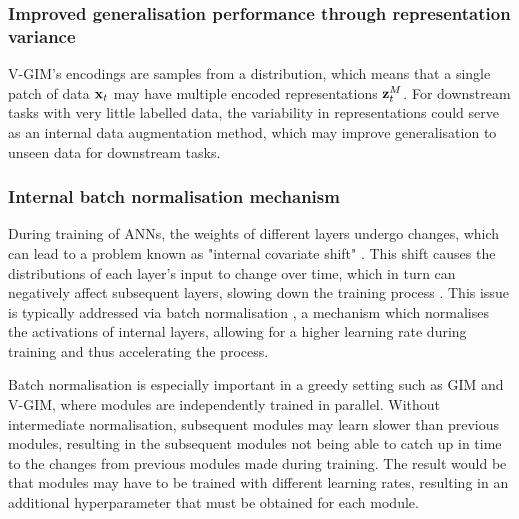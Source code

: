 	
	\subsubsection{Improved generalisation performance through representation variance}
		V-GIM's encodings are samples from a distribution, which means that a single patch of data $\mathbf{x}_t$ may have multiple encoded representations $\mathbf{z}_t^M$. For downstream tasks with very little labelled data, the variability in representations could serve as an internal data augmentation method, which may improve generalisation to unseen data for downstream tasks.
		

	
	\subsubsection{Internal batch normalisation mechanism}
		During training of ANNs, the weights of different layers undergo changes, which can lead to a problem known as "internal covariate shift" \cite{ioffeBatchNormalizationAccelerating2015}. This shift causes the distributions of each layer's input to change over time, which in turn can negatively affect subsequent layers, slowing down the training process \cite{bjorckUnderstandingBatchNormalization2018, lecunEfficientBackProp1998}. This issue is typically addressed via batch normalisation \cite{santurkarHowDoesBatch2018, bjorckUnderstandingBatchNormalization2018}, a mechanism which normalises the activations of internal layers, allowing for a higher learning rate during training and thus accelerating the process.
			
		Batch normalisation is especially important in a greedy setting such as GIM and V-GIM, where modules are independently trained in parallel. Without intermediate normalisation, subsequent modules may learn slower than previous modules, resulting in the subsequent modules not being able to catch up in time to the changes from previous modules made during training. The result would be that modules may have to be trained with different learning rates, resulting in an additional hyperparameter that must be obtained for each module.
		
